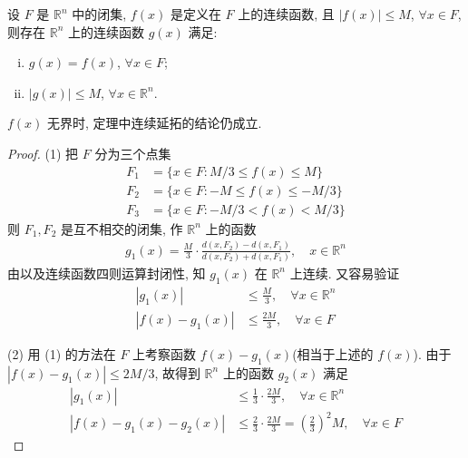 \documentclass[../../main.tex]{subfiles}
\begin{document}
\begin{theorem}\label{theorem:连续函数延拓定理(Tietze扩张定理)}
设 $F$ 是 $\mathbb{R}^n$ 中的闭集, $f(x)$ 是定义在 $F$ 上的连续函数, 且 $|f(x)| \leqslant M$, $\forall x \in F$, 则存在 $\mathbb{R}^n$ 上的连续函数 $g(x)$ 满足:
\begin{enumerate}[(i)]
\item $g(x) = f(x)$, $\forall x \in F$;
\item $|g(x)| \leqslant M$, $\forall x \in \mathbb{R}^n$.
\end{enumerate}
\end{theorem}
\begin{remark}
$f(x)$ 无界时, 定理中连续延拓的结论仍成立. 
\end{remark}
\begin{proof}
(1) 把 $F$ 分为三个点集
\begin{align*}
F_1 &= \{x \in F : M/3 \leqslant f(x) \leqslant M\}\\
F_2 &= \{x \in F : -M \leqslant f(x) \leqslant -M/3\}\\
F_3 &= \{x \in F : -M/3 < f(x) < M/3\}
\end{align*}
则 $F_1, F_2$ 是互不相交的闭集, 作 $\mathbb{R}^n$ 上的函数
\begin{align*}
g_1(x) = \frac{M}{3} \cdot \frac{d(x, F_2) - d(x, F_1)}{d(x, F_2) + d(x, F_1)}, \quad x \in \mathbb{R}^n
\end{align*}
由以及连续函数四则运算封闭性, 知 $g_1(x)$ 在 $\mathbb{R}^n$ 上连续. 又容易验证
\begin{align*}
|g_1(x)| &\leqslant \frac{M}{3}, \quad \forall x \in \mathbb{R}^n\\
|f(x) - g_1(x)| &\leqslant \frac{2M}{3}, \quad \forall x \in F
\end{align*}

(2) 用 (1) 的方法在 $F$ 上考察函数 $f(x) - g_1(x)$(相当于上述的 $f(x)$). 由于 $|f(x) - g_1(x)| \leqslant 2M/3$, 故得到 $\mathbb{R}^n$ 上的函数 $g_2(x)$ 满足
\begin{align*}
|g_1(x)| &\leqslant \frac{1}{3} \cdot \frac{2M}{3}, \quad \forall x \in \mathbb{R}^n\\
|f(x) - g_1(x) - g_2(x)| &\leqslant \frac{2}{3} \cdot \frac{2M}{3} = \left(\frac{2}{3}\right)^2 M, \quad \forall x \in F
\end{align*}


\end{proof}
\end{document}
